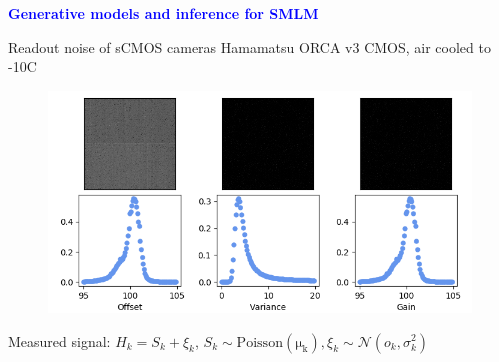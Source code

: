 \documentclass{beamer}					%
\begin{document}
\begin{frame}
\frametitle{}
\centering
\Large \textbf{\textcolor{blue}{Generative models and inference for SMLM}}
\end{frame}

\begin{frame}{Readout noise of sCMOS cameras}
Hamamatsu ORCA v3 CMOS, air cooled to -10C
\begin{figure}
\includegraphics[width=12cm]{Noise-Maps.png}
\end{figure}
Measured signal: $H_{k} = S_{k} + \xi_{k}$, $S_{k}\sim \mathrm{Poisson(\mu_{k})}, \xi_{k}\sim \mathcal{N}(o_{k},\sigma_{k}^{2})$
\end{frame}
\end{document}
